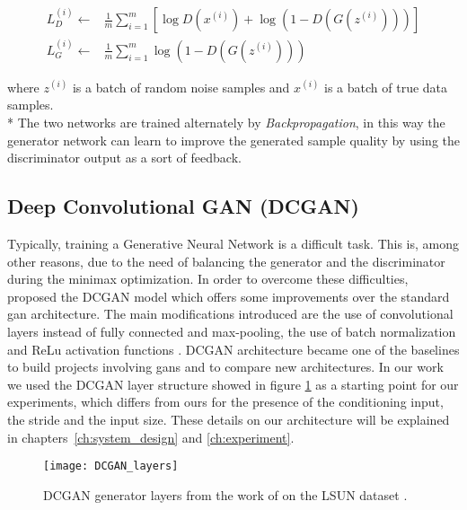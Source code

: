 \begin{equation}
\label{eq:ganloss}
\begin{split}
L_{D}^{(i)} \gets & \frac{1}{m} \sum_{i=1}^m \left[
\log D\left({x}^{(i)}\right)
+ \log \left(1-D\left(G\left({z}^{(i)}\right)\right)\right)
\right] \\
L_{G}^{(i)} \gets & \frac{1}{m} \sum_{i=1}^m
\log \left(1-D\left(G\left({z}^{(i)}\right)\right)\right)
\end{split}
\end{equation}

where ${z}^{(i)}$ is a batch of random noise samples and ${x}^{(i)}$ is a batch of true data samples. \\*
The two networks are trained alternately by \textit{Backpropagation}, in this way the generator network can learn to improve the generated sample quality by using the discriminator output as a sort of feedback. 
\newpage

\subsection{Deep Convolutional GAN (DCGAN)}
Typically, training a Generative Neural Network is a difficult task. This is, among other reasons, due to the need of balancing the generator and the discriminator during the minimax optimization. In order to overcome these difficulties, \citeauthor{gan:dcgan} proposed the DCGAN model \cite{gan:dcgan} which offers some improvements over the standard \gls{gan} architecture. The main modifications introduced are the use of convolutional layers instead of fully connected and max-pooling, the use of batch normalization \cite{batchnorm} and ReLu activation functions \cite{relu}. DCGAN architecture became one of the baselines to build projects involving \glspl{gan} and to compare new architectures. In our work we used the DCGAN layer structure showed in figure \ref{fig:dcganlayers} as a starting point for our experiments, which differs from ours for the presence of the conditioning input, the stride and the input size. These details on our architecture will be explained in chapters~\ref{ch:system_design} and \ref{ch:experiment}.

\begin{figure}[h!]
	\begin{center}
		\texttt{[image: DCGAN\_layers]}
	\end{center}
	
	\captionsetup{width=1\linewidth}
	\caption[Layers  from DCGAN, \citeauthor{gan:dcgan}]{DCGAN generator layers from the work of \citeauthor{gan:dcgan} on the LSUN dataset \cite[p.4]{gan:dcgan}.}
	\label{fig:dcganlayers}
	\medskip
\end{figure}

